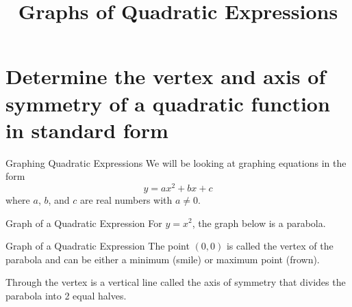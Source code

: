 \documentclass[t,usenames,dvipsnames]{beamer}
\title{Graphs of Quadratic Expressions}
\author{}
\date{}
\begin{document}
\begin{frame}
    \maketitle
\end{frame}

\section{Determine the vertex and axis of symmetry of a quadratic function in standard form}

\begin{frame}{Graphing Quadratic Expressions}
We will be looking at graphing equations in the form
\[ y = ax^2 + bx + c \]
where $a$, $b$, and $c$ are real numbers with $a \neq 0$. 
\end{frame}

\begin{frame}{Graph of a Quadratic Expression}
For $y= x^2$, the graph below is a \alert{parabola}.
\begin{center}
\end{center}
\end{frame}

\begin{frame}{Graph of a Quadratic Expression}
The point $(0,0)$ is called the \alert{vertex} of the parabola and can be either a minimum (smile) or maximum point (frown). \newline\\  \pause

Through the vertex is a vertical line called the \alert{axis of symmetry} that divides the parabola into 2 equal halves. 
\end{frame}
\end{document}
